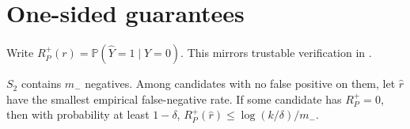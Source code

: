 \section{One-sided guarantees}\label{sec:one-sided}

Write $R^+_P(r)=\mathbb P(\hat Y=1\mid Y=0)$.
This mirrors trustable verification in \citet{balcan2025verifiers}.

\begin{proposition}\label{prop:one-sided}
$S_2$ contains $m_-$ negatives.
Among candidates with no false positive on them, let $\hat r$ have the smallest empirical false-negative rate.
If some candidate has $R^+_P=0$, then with probability at least $1-\delta$, $R^+_P(\hat r)\le\log(k/\delta)/m_-$.
\end{proposition}

